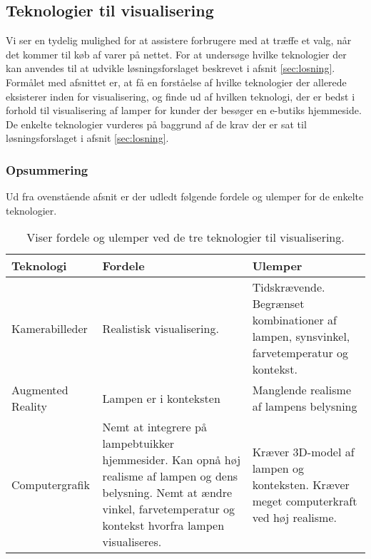 \subsection{Teknologier til visualisering}
\label{sec:tek_til_visualisering}
Vi ser en tydelig mulighed for at assistere forbrugere med at træffe et valg, når det kommer til køb af varer på nettet. For at undersøge hvilke teknologier der kan anvendes til at udvikle løsningsforslaget beskrevet i afsnit \ref{sec:losning}. Formålet med afsnittet er, at få en forståelse af hvilke teknologier der allerede eksisterer inden for visualisering, og finde ud af hvilken teknologi, der er bedst i forhold til visualisering af lamper for kunder der besøger en e-butiks hjemmeside. De enkelte teknologier vurderes på baggrund af de krav der er sat til løsningsforslaget i afsnit \ref{sec:losning}.







\subsubsection*{Opsummering}
Ud fra ovenstående afsnit er der udledt følgende fordele og ulemper for de enkelte teknologier.
\begin{table}[H]
  \centering
  
\center
    \begin{tabular}{ | p{3cm} | p{5cm} | p{5cm} |}
    
    \hline
    Teknologi & Fordele & Ulemper \\ \hline
    Kamerabilleder & Realistisk visualisering. & Tidskrævende. Begrænset kombinationer af lampen, synsvinkel, farvetemperatur og kontekst. \\ \hline
    Augmented Reality & Lampen er i konteksten & Manglende realisme af lampens belysning \\ \hline
   Computergrafik & Nemt at integrere på lampebtuikker hjemmesider. Kan opnå høj realisme af lampen og dens belysning. \newline Nemt at ændre vinkel, farvetemperatur og kontekst hvorfra lampen visualiseres. & Kræver 3D-model af lampen og konteksten. Kræver meget computerkraft ved høj realisme. \\ \hline
    \end{tabular}
  \caption{Viser fordele og ulemper ved de tre teknologier til visualisering.}
\label{tab:fordele_ulemper_teknologier}
\end{table}

